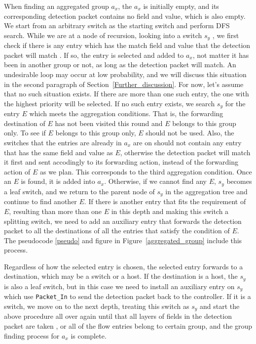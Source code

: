 When finding an aggregated group $a_x$, the $a_x$ is initially empty, and its corresponding detection packet contains no field and value, which is also empty. We start from an arbitrary switch as the starting switch and perform DFS search. While we are at a node of recursion, looking into a switch $s_y$ \sout{}, we first check if there is any entry which has the match field and value that the detection packet will match \sout{}. If so, the entry is selected and added to $a_x$, not matter it has been in another group or not, as long as the detection packet will match. An undesirable loop may occur at low probability, and we will discuss this situation in the second paragraph of Section~\ref{Further_discussion}. For now, let's assume that no such situation exists. If there are more than one such entry, the one with the highest priority will be selected. If no such entry exists, we search $s_y$ for the entry $E$ which meets the aggregation conditions. That is, the forwarding destination of $E$ has not been visited this round and $E$ belongs to this group only. To see if $E$ belongs to this group only, $E$ should not be used. Also, the switches that the entries are already in $a_x$ are on should not
contain any entry that has the same field and value as $E$, \sout{}
otherwise the detection packet will match it first and sent accodingly to its forwarding action, instead of the forwarding action of $E$ as we plan. This corresponds to the third aggregation condition. Once an $E$ is found, it is added into $a_x$. Otherwise, if we cannot find any $E$, $s_y$ becomes a leaf switch, and we return to the parent node of $s_y$ in the aggregation tree and continue to find another $E$. If there is another entry that fits the requirement of $E$, resulting than more than one $E$ in this depth and making this switch a splitting switch, we need to add an auxiliary entry that forwards the detection packet to all the destinations of all the entries that satisfy the condition of $E$. The pseudocode \ref{pseudo} and figure in Figure~\ref{aggregated_group} include this process.

\sout{}

Regardless of how the selected entry is chosen, the selected entry forwards to a destination, which may be a switch or a host. If the destination is a host, the $s_y$ is also a leaf switch, but in this case we need to install an auxiliary entry on $s_y$ which use \texttt{Packet\_In} to send the detection packet back to the controller. If it is a switch, we move on to the next depth, treating this switch as $s_y$ and start the above procedure all over again until that all layers of fields in the detection packet are taken \sout{}, or all of the flow entries belong to certain group, and the group finding process for $a_x$ is complete.

